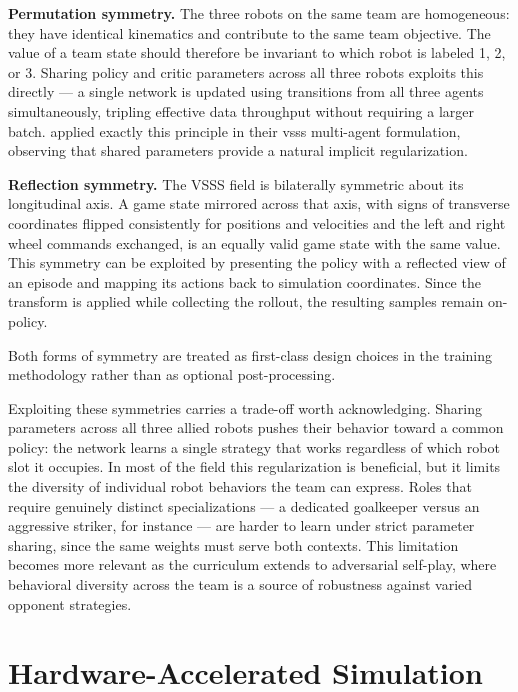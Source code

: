 \textbf{Permutation symmetry.}  The three robots on the same team are
homogeneous: they have identical kinematics and contribute to the same team
objective.  The value of a team state should therefore be invariant to which
robot is labeled 1, 2, or 3.  Sharing policy and critic parameters across all
three robots exploits this directly — a single network is updated using
transitions from all three agents simultaneously, tripling effective data
throughput without requiring a larger batch.  \textcite{brandao2022} applied
exactly this principle in their \gls{vsss} multi-agent formulation, observing
that shared parameters provide a natural implicit regularization.

\textbf{Reflection symmetry.}  The VSSS field is bilaterally symmetric about
its longitudinal axis.  A game state mirrored across that axis, with signs of
transverse coordinates flipped consistently for positions and velocities and
the left and right wheel commands exchanged, is an equally valid game state
with the same value.  This symmetry can be exploited by presenting the policy
with a reflected view of an episode and mapping its actions back to simulation
coordinates.  Since the transform is applied while collecting the rollout, the
resulting samples remain on-policy.

Both forms of symmetry are treated as first-class design choices in the
training methodology rather than as optional post-processing.

Exploiting these symmetries carries a trade-off worth acknowledging.
Sharing parameters across all three allied robots pushes their behavior toward
a common policy: the network learns a single strategy that works regardless
of which robot slot it occupies.  In most of the field this regularization is
beneficial, but it limits the diversity of individual robot behaviors the team
can express.  Roles that require genuinely distinct specializations — a
dedicated goalkeeper versus an aggressive striker, for instance — are harder
to learn under strict parameter sharing, since the same weights must serve
both contexts.  This limitation becomes more relevant as the curriculum extends
to adversarial self-play, where behavioral diversity across the team
is a source of robustness against varied opponent strategies.

\section{Hardware-Accelerated Simulation}

